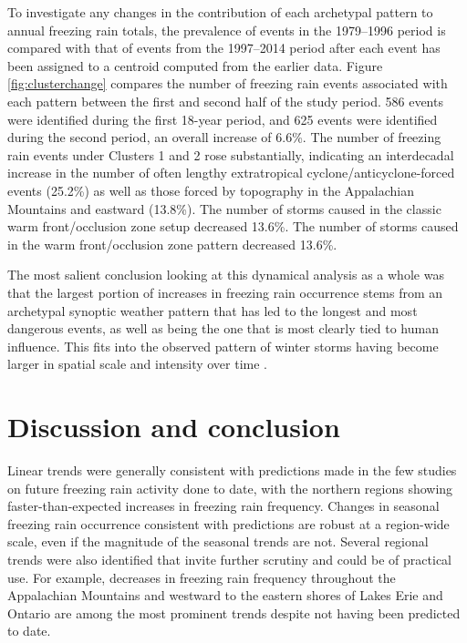 \documentclass[twocol]{ametsoc}
\begin{document}
To investigate any changes in the contribution of each archetypal pattern to annual freezing rain totals, the prevalence of events in the 1979--1996 period is compared with that of events from the 1997--2014 period after each event has been assigned to a centroid computed from the earlier data. Figure \ref{fig:clusterchange} compares the number of freezing rain events associated with each pattern between the first and second half of the study period. 586 events were identified during the first 18-year period, and 625 events were identified during the second period, an overall increase of 6.6\%. The number of freezing rain events under Clusters 1 and 2  rose substantially, indicating an interdecadal increase in the number of often lengthy extratropical cyclone/anticyclone-forced events (25.2\%) as well as those forced by topography in the Appalachian Mountains and eastward (13.8\%). The number of storms caused in the classic warm front/occlusion zone setup decreased 13.6\%.  The number of storms caused in the warm front/occlusion zone pattern decreased 13.6\%. 

The most salient conclusion looking at this dynamical analysis as a whole was that the largest portion of increases in freezing rain occurrence stems from an archetypal synoptic weather pattern that has led to the longest and most dangerous events, as well as being the one that is most clearly tied to human influence. This fits into the observed pattern of winter storms having become larger in spatial scale and intensity over time \citep{changnon2007catastrophic}. 

\section{Discussion and conclusion}
Linear trends were generally consistent with predictions made in the few studies on future freezing rain activity done to date, with the northern regions showing faster-than-expected increases in freezing rain frequency. Changes in seasonal freezing rain occurrence consistent with predictions are robust at a region-wide scale, even if the magnitude of the seasonal trends are not. Several regional trends were also identified that invite further scrutiny and could be of practical use. For example, decreases in freezing rain frequency throughout the Appalachian Mountains and westward to the eastern shores of Lakes Erie and Ontario are among the most prominent trends despite not having been predicted to date. 
\end{document}
